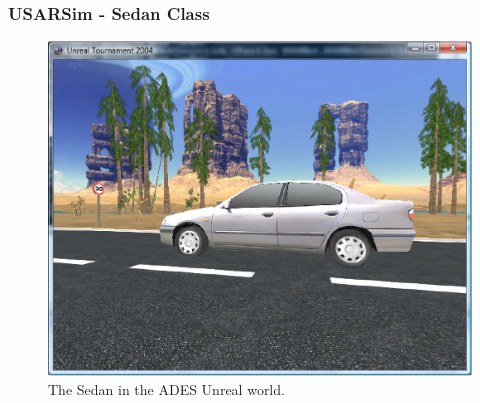 \documentclass{beamer}
\begin{document}
\begin{frame}
	\frametitle{USARSim - Sedan Class}
	\begin{figure}[ht]
	\begin{center}
	\includegraphics[width=.6\paperwidth]{../img/Sedan.eps}
	\caption{The Sedan in the ADES Unreal world.}
	\label{fig:Sedan}
	\end{center}
	\end{figure}
\end{frame}
\end{document}
